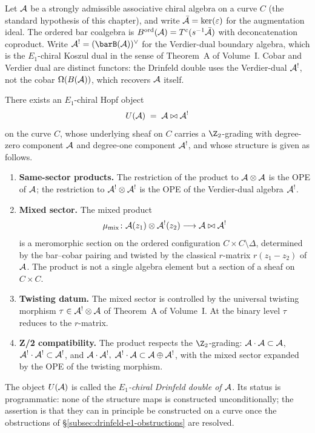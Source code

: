 Let $\mathcal{A}$ be a strongly admissible associative chiral algebra
on a curve $C$ (the standard hypothesis of this chapter), and
write $\bar{\mathcal{A}} = \ker(\varepsilon)$ for the augmentation ideal.
The ordered bar coalgebra is
$B^{\mathrm{ord}}(\mathcal{A}) = T^c(s^{-1}\bar{\mathcal{A}})$ with
deconcatenation coproduct. Write $\cA^! = (\barB(\cA))^\vee$
for the Verdier-dual boundary algebra, which is the
$E_1$-chiral Koszul dual in the sense of Theorem~A of
Volume~I. Cobar and Verdier dual are distinct functors:
the Drinfeld double uses the Verdier-dual $\mathcal{A}^!$, not the
cobar $\Omega(B(\mathcal{A}))$, which recovers $\mathcal{A}$ itself.

\begin{conjecture}
\label{conj:drinfeld-double-e1-construction}
There exists an $E_1$-chiral Hopf object
\[
U(\mathcal{A}) \;=\; \mathcal{A} \bowtie \mathcal{A}^!
\]
on the curve $C$, whose underlying sheaf on $C$ carries a
$\Z_2$-grading with degree-zero component $\mathcal{A}$ and
degree-one component $\mathcal{A}^!$, and whose structure is given
as follows.
\begin{enumerate}[label=\textup{(D\arabic*)}, leftmargin=*]
\item \textbf{Same-sector products.} The restriction of the
product to $\mathcal{A} \otimes \mathcal{A}$ is the OPE of $\mathcal{A}$; the
restriction to $\mathcal{A}^! \otimes \mathcal{A}^!$ is the OPE of the
Verdier-dual algebra $\mathcal{A}^!$.
\item \textbf{Mixed sector.} The mixed product
\[
\mu_{\mathrm{mix}}\colon\mathcal{A}(z_1) \otimes \mathcal{A}^!(z_2) \longrightarrow
\mathcal{A} \bowtie \mathcal{A}^!
\]
is a meromorphic section on the ordered configuration
$C\times C \setminus \Delta$, determined by the
bar--cobar pairing and twisted by the classical $r$-matrix
$r(z_1 - z_2)$ of $\mathcal{A}$. The product is not a single
algebra element but a section of a sheaf on $C\times C$.
\item \textbf{Twisting datum.} The mixed sector is
controlled by the universal twisting morphism
$\tau\in\mathcal{A}^!\otimes\mathcal{A}$ of Theorem~A of Volume~I.
At the binary level $\tau$ reduces to the $r$-matrix.
\item \textbf{Z/2 compatibility.} The product respects the
$\Z_2$-grading: $\mathcal{A}\cdot\mathcal{A}\subset\mathcal{A}$,
$\mathcal{A}^!\cdot\mathcal{A}^!\subset\mathcal{A}^!$, and
$\mathcal{A}\cdot\mathcal{A}^!,\;\mathcal{A}^!\cdot\mathcal{A}\subset\mathcal{A}\oplus\mathcal{A}^!$,
with the mixed sector expanded by the OPE of the twisting
morphism.
\end{enumerate}
The object $U(\mathcal{A})$ is called the \emph{$E_1$-chiral
Drinfeld double of $\mathcal{A}$}. Its status is programmatic:
none of the structure maps is constructed unconditionally;
the assertion is that they can in principle be constructed
on a curve once the obstructions of
\S\ref{subsec:drinfeld-e1-obstructions} are resolved.
\end{conjecture}

